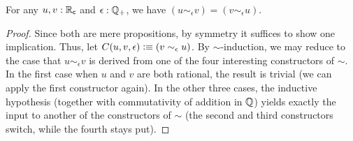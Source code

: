 \begin{lem}\label{thm:RCsim-symmetric}
  For any $u,v:\mathbb{R}_\mathsf{c}$ and $\epsilon:\mathbb{Q}_{+}$, we have $(u\sim_\epsilon v) = (v\sim_\epsilon u)$.
\end{lem}
\begin{proof}
  Since both are mere propositions, by symmetry it suffices to show one implication.
  Thus, let $C(u,v,\epsilon) \vcentcolon\equiv (v\sim_\epsilon u)$.
  By $\sim$-induction, we may reduce to the case that $u\sim_\epsilon v$ is derived from one of the four interesting constructors of $\sim$.
  In the first case when $u$ and $v$ are both rational, the result is trivial (we can apply the first constructor again).
  In the other three cases, the inductive hypothesis (together with commutativity of addition in $\mathbb{Q}$) yields exactly the input to another of the constructors of $\sim$ (the second and third constructors switch, while the fourth stays put).
\end{proof}

